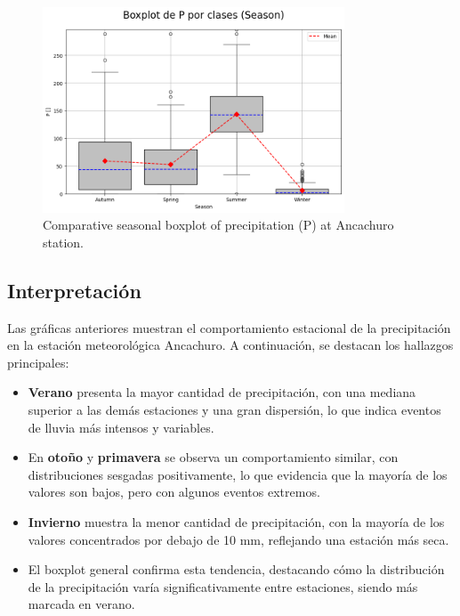 \vspace{0.5cm}

\begin{figure}[H]
\centering
\includegraphics[width=0.8\textwidth]{resultados/por_estacion_del_anio/boxplot_clases_por_estacion/Ancachuro/P_ClassBoxplot_Season.png}
\caption{Comparative seasonal boxplot of precipitation (P) at Ancachuro station.}
\label{fig:ancachuro_p_box}
\end{figure}

\subsection{Interpretación}

Las gráficas anteriores muestran el comportamiento estacional de la precipitación en la estación meteorológica Ancachuro. A continuación, se destacan los hallazgos principales:

\begin{itemize}
    \item \textbf{Verano} presenta la mayor cantidad de precipitación, con una mediana superior a las demás estaciones y una gran dispersión, lo que indica eventos de lluvia más intensos y variables.
    \item En \textbf{otoño} y \textbf{primavera} se observa un comportamiento similar, con distribuciones sesgadas positivamente, lo que evidencia que la mayoría de los valores son bajos, pero con algunos eventos extremos.
    \item \textbf{Invierno} muestra la menor cantidad de precipitación, con la mayoría de los valores concentrados por debajo de 10 mm, reflejando una estación más seca.
    \item El boxplot general confirma esta tendencia, destacando cómo la distribución de la precipitación varía significativamente entre estaciones, siendo más marcada en verano.
\end{itemize}




